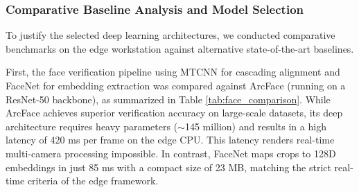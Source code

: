 \documentclass[12pt,a4paper]{article}
\begin{document}
\begin{table}[h]
    \centering
    \caption{Target Multi-Hazard Anomaly Detection Model Metrics (Expected Metrics)}
    \label{tab:anomaly_bench}
\end{table}

\begin{table}[h]
    \centering
    \caption{Multi-Camera Processing Frame Rate (FPS) Scalability (Pilot Benchmarks)}
    \label{tab:fps_bench}
\end{table}

\subsubsection{Comparative Baseline Analysis and Model Selection}
To justify the selected deep learning architectures, we conducted comparative benchmarks on the edge workstation against alternative state-of-the-art baselines.

First, the face verification pipeline using MTCNN for cascading alignment and FaceNet for embedding extraction was compared against ArcFace \cite{arcface_2019} (running on a ResNet-50 backbone), as summarized in Table \ref{tab:face_comparison}. 
While ArcFace achieves superior verification accuracy on large-scale datasets, its deep architecture requires heavy parameters ($\sim$145 million) and results in a high latency of 420 ms per frame on the edge CPU. This latency renders real-time multi-camera processing impossible. In contrast, FaceNet maps crops to 128D embeddings in just 85 ms with a compact size of 23 MB, matching the strict real-time criteria of the edge framework.
\end{document}
